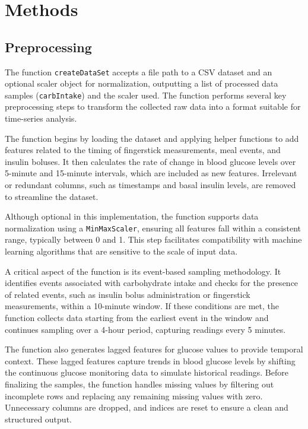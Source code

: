 
\section{Methods}

\subsection{Preprocessing}


The function \texttt{createDataSet} accepts a file path to a CSV dataset and an optional scaler object for normalization, outputting a list of processed data samples (\texttt{carbIntake}) and the scaler used. The function performs several key preprocessing steps to transform the collected raw data into a format suitable for time-series analysis.

The function begins by loading the dataset and applying helper functions to add features related to the timing of fingerstick measurements, meal events, and insulin boluses. It then calculates the rate of change in blood glucose levels over 5-minute and 15-minute intervals, which are included as new features. Irrelevant or redundant columns, such as timestamps and basal insulin levels, are removed to streamline the dataset.

Although optional in this implementation, the function supports data normalization using a \texttt{MinMaxScaler}, ensuring all features fall within a consistent range, typically between 0 and 1. This step facilitates compatibility with machine learning algorithms that are sensitive to the scale of input data.

A critical aspect of the function is its event-based sampling methodology. It identifies events associated with carbohydrate intake and checks for the presence of related events, such as insulin bolus administration or fingerstick measurements, within a 10-minute window. If these conditions are met, the function collects data starting from the earliest event in the window and continues sampling over a 4-hour period, capturing readings every 5 minutes.

The function also generates lagged features for glucose values to provide temporal context. These lagged features capture trends in blood glucose levels by shifting the continuous glucose monitoring data to simulate historical readings. Before finalizing the samples, the function handles missing values by filtering out incomplete rows and replacing any remaining missing values with zero. Unnecessary columns are dropped, and indices are reset to ensure a clean and structured output.

